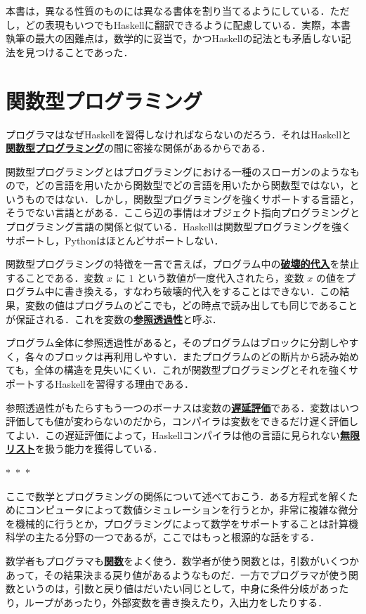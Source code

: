 \documentclass[a4paper,twocolumn]{jsbook}
\newcommand{\separator}{\begin{center}$*$~$*$~$*$\end{center}}
\newcommand{\programminglanguage}[1]{\textsf{#1}}
\newcommand{\haskell}{\programminglanguage{Haskell}}
\newcommand{\python}{\programminglanguage{Python}}
\newcommand{\keyword}[1]{{\underline{\textbf{#1}}}}
\begin{document}
本書は，異なる性質のものには異なる書体を割り当てるようにしている．ただし，どの表現もいつでも\haskell に翻訳できるように配慮している．実際，本書執筆の最大の困難点は，数学的に妥当で，かつ\haskell の記法とも矛盾しない記法を見つけることであった．

\section{関数型プログラミング}

プログラマはなぜ\haskell を習得しなければならないのだろう．それは\haskell と\keyword{関数型プログラミング}の間に密接な関係があるからである．

関数型プログラミングとはプログラミングにおける一種のスローガンのようなもので，どの言語を用いたから関数型でどの言語を用いたから関数型ではない，というものではない．しかし，関数型プログラミングを強くサポートする言語と，そうでない言語とがある．ここら辺の事情はオブジェクト指向プログラミングとプログラミング言語の関係と似ている．\haskell は関数型プログラミングを強くサポートし，\python はほとんどサポートしない．

関数型プログラミングの特徴を一言で言えば，プログラム中の\keyword{破壊的代入}を禁止することである．変数 $x$ に $1$ という数値が一度代入されたら，変数 $x$ の値をプログラム中に書き換える，すなわち破壊的代入をすることはできない．この結果，変数の値はプログラムのどこでも，どの時点で読み出しても同じであることが保証される．これを変数の\keyword{参照透過性}と呼ぶ．

プログラム全体に参照透過性があると，そのプログラムはブロックに分割しやすく，各々のブロックは再利用しやすい．またプログラムのどの断片から読み始めても，全体の構造を見失いにくい．これが関数型プログラミングとそれを強くサポートする\haskell を習得する理由である．

参照透過性がもたらすもう一つのボーナスは変数の\keyword{遅延評価}である．変数はいつ評価しても値が変わらないのだから，コンパイラは変数をできるだけ遅く評価してよい．この遅延評価によって，\haskell コンパイラは他の言語に見られない\keyword{無限リスト}を扱う能力を獲得している．

\separator

ここで数学とプログラミングの関係について述べておこう．ある方程式を解くためにコンピュータによって数値シミュレーションを行うとか，非常に複雑な微分を機械的に行うとか，プログラミングによって数学をサポートすることは計算機科学の主たる分野の一つであるが，ここではもっと根源的な話をする．

数学者もプログラマも\keyword{関数}をよく使う．数学者が使う関数とは，引数がいくつかあって，その結果決まる戻り値があるようなものだ．一方でプログラマが使う関数というのは，引数と戻り値はだいたい同じとして，中身に条件分岐があったり，ループがあったり，外部変数を書き換えたり，入出力をしたりする．
\end{document}
